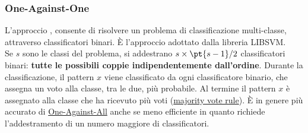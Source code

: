 \subsubsection{One-Against-One}\label{sec:one_against_one} %
L'approccio , consente di risolvere un problema di classificazione multi-classe, attraverso classificatori binari.
È l'approccio adottato dalla libreria LIBSVM.
\\
Se $s$ sono le classi del problema, si addestrano $s \times\pt{s-1}/2$ classificatori binari: \textbf{tutte le possibili coppie indipendentemente dall'ordine}.
\emptyln{}
Durante la classificazione, il pattern $x$ viene classificato da ogni classificatore binario, che assegna un voto alla classe, tra le due, più probabile.
Al termine il pattern $x$ è assegnato alla classe che ha ricevuto più voti (\hyperref[th:maj-vote-rule]{majority vote rule}).
\emptyln{}
È in genere più accurato di \hyperref[def:svm-one-ag-all]{One-Against-All} anche se meno efficiente in quanto richiede l'addestramento di un numero maggiore di classificatori.
%
